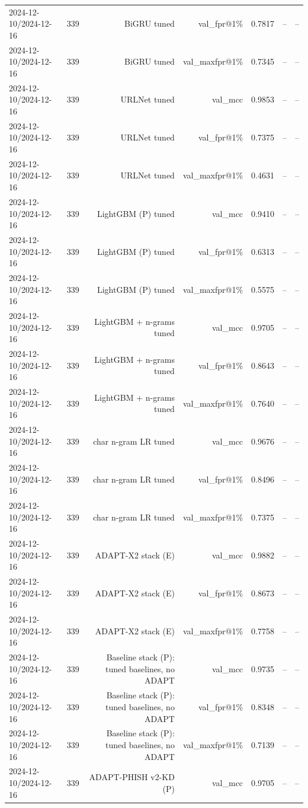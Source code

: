 \begin{table}[t]
\begin{tabular}{llrrrrr}
2024-12-10/2024-12-16 & 339 & BiGRU tuned & val\_fpr@1\% & 0.7817 & -- & -- \\
2024-12-10/2024-12-16 & 339 & BiGRU tuned & val\_maxfpr@1\% & 0.7345 & -- & -- \\
2024-12-10/2024-12-16 & 339 & URLNet tuned & val\_mcc & 0.9853 & -- & -- \\
2024-12-10/2024-12-16 & 339 & URLNet tuned & val\_fpr@1\% & 0.7375 & -- & -- \\
2024-12-10/2024-12-16 & 339 & URLNet tuned & val\_maxfpr@1\% & 0.4631 & -- & -- \\
2024-12-10/2024-12-16 & 339 & LightGBM (P) tuned & val\_mcc & 0.9410 & -- & -- \\
2024-12-10/2024-12-16 & 339 & LightGBM (P) tuned & val\_fpr@1\% & 0.6313 & -- & -- \\
2024-12-10/2024-12-16 & 339 & LightGBM (P) tuned & val\_maxfpr@1\% & 0.5575 & -- & -- \\
2024-12-10/2024-12-16 & 339 & LightGBM + n-grams tuned & val\_mcc & 0.9705 & -- & -- \\
2024-12-10/2024-12-16 & 339 & LightGBM + n-grams tuned & val\_fpr@1\% & 0.8643 & -- & -- \\
2024-12-10/2024-12-16 & 339 & LightGBM + n-grams tuned & val\_maxfpr@1\% & 0.7640 & -- & -- \\
2024-12-10/2024-12-16 & 339 & char n-gram LR tuned & val\_mcc & 0.9676 & -- & -- \\
2024-12-10/2024-12-16 & 339 & char n-gram LR tuned & val\_fpr@1\% & 0.8496 & -- & -- \\
2024-12-10/2024-12-16 & 339 & char n-gram LR tuned & val\_maxfpr@1\% & 0.7375 & -- & -- \\
2024-12-10/2024-12-16 & 339 & ADAPT-X2 stack (E) & val\_mcc & 0.9882 & -- & -- \\
2024-12-10/2024-12-16 & 339 & ADAPT-X2 stack (E) & val\_fpr@1\% & 0.8673 & -- & -- \\
2024-12-10/2024-12-16 & 339 & ADAPT-X2 stack (E) & val\_maxfpr@1\% & 0.7758 & -- & -- \\
2024-12-10/2024-12-16 & 339 & Baseline stack (P): tuned baselines, no ADAPT & val\_mcc & 0.9735 & -- & -- \\
2024-12-10/2024-12-16 & 339 & Baseline stack (P): tuned baselines, no ADAPT & val\_fpr@1\% & 0.8348 & -- & -- \\
2024-12-10/2024-12-16 & 339 & Baseline stack (P): tuned baselines, no ADAPT & val\_maxfpr@1\% & 0.7139 & -- & -- \\
2024-12-10/2024-12-16 & 339 & ADAPT-PHISH v2-KD (P) & val\_mcc & 0.9705 & -- & -- \\

\end{tabular}
\end{table}
